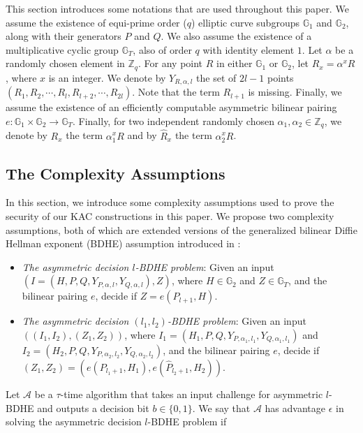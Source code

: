 This section introduces some notations that are used throughout this paper. We assume the existence of equi-prime order ($q$) elliptic curve subgroups $\mathbb{G}_1$ and $\mathbb{G}_2$, along with their generators $P$ and $Q$. We also assume the existence of a multiplicative cyclic group $\mathbb{G}_{T}$, also of order $q$ with identity element $1$. Let $\alpha$ be a randomly chosen element in $\mathbb{Z}_q$. For any point $R$ in either $\mathbb{G}_1$ or $\mathbb{G}_2$, let $R_x=\alpha^xR$, where $x$ is an integer. We denote by $Y_{R,\alpha,l}$ the set of $2l-1$ points $(R_1,R_2,\cdots,R_{l},R_{l+2},\cdots,R_{2l})$. Note that the term $R_{l+1}$ is missing. Finally, we assume the existence of an efficiently computable asymmetric bilinear pairing ${e}:\mathbb{G}_1 \times \mathbb{G}_2\longrightarrow\mathbb{G}_T$. Finally, for two independent randomly chosen $\alpha_1,\alpha_2\in\mathbb{Z}_q$, we denote by $R_x$ the term $\alpha^x_1R$ and by $\hat{R}_x$ the term $\alpha^x_2R$. 


\subsection{The Complexity Assumptions}
\label{subsec:complexity}

In this section, we introduce some complexity assumptions used to prove the security of our KAC constructions in this paper. We propose two complexity assumptions, both of which are extended versions of the generalized bilinear Diffie Hellman exponent (BDHE) assumption introduced in \cite{boneh2005collusion}:

\begin{itemize}
 
 \item \emph{The asymmetric decision $l$-BDHE problem}: Given an input $(I=(H,P,Q,Y_{P,\alpha,l},Y_{Q,\alpha,l}),Z)$, where $H\in\mathbb{G}_2$ and $Z\in\mathbb{G}_T$, and the bilinear pairing ${e}$, decide if $Z={e}(P_{l+1},H)$.
 
 \item \emph{The asymmetric decision $(l_1,l_2)$-BDHE problem}: Given an input $((I_1,I_2),(Z_1,Z_2))$, where $I_1=(H_1,P,Q,Y_{P,\alpha_1,l_1},Y_{Q,\alpha_1,l_1})$ and $I_2=(H_2,P,Q,Y_{P,\alpha_2,l_2},Y_{Q,\alpha_2,l_2})$, and the bilinear pairing ${e}$, decide if $(Z_1,Z_2)=\left({e}(P_{l_1+1},H_1),{e}(\hat{P}_{l_2+1},H_2)\right)$.
\end{itemize}

Let $\mathcal{A}$ be a $\tau$-time algorithm that takes an input challenge for asymmetric $l$-BDHE and outputs a decision bit $b\in\{0,1\}$. We say that $\mathcal{A}$ has advantage $\epsilon$ in solving the asymmetric decision $l$-BDHE problem if 

